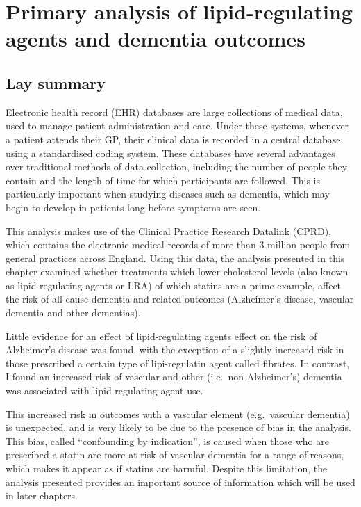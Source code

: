 \documentclass[a4paper, twoside]{templates/ociamthesis}
\begin{document}
\minitoc 



\hypertarget{cprd-analysis-heading}{%
\chapter{Primary analysis of lipid-regulating agents and dementia outcomes}\label{cprd-analysis-heading}}

\minitoc 

\hypertarget{lay-summary-3}{%
\section{Lay summary}\label{lay-summary-3}}

Electronic health record (EHR) databases are large collections of medical data, used to manage patient administration and care. Under these systems, whenever a patient attends their GP, their clinical data is recorded in a central database using a standardised coding system. These databases have several advantages over traditional methods of data collection, including the number of people they contain and the length of time for which participants are followed. This is particularly important when studying diseases such as dementia, which may begin to develop in patients long before symptoms are seen.

This analysis makes use of the Clinical Practice Research Datalink (CPRD), which contains the electronic medical records of more than 3 million people from general practices across England. Using this data, the analysis presented in this chapter examined whether treatments which lower cholesterol levels (also known as lipid-regulating agents or LRA) of which statins are a prime example, affect the risk of all-cause dementia and related outcomes (Alzheimer's disease, vascular dementia and other dementias).

Little evidence for an effect of lipid-regulating agents effect on the risk of Alzheimer's disease was found, with the exception of a slightly increased risk in those prescribed a certain type of lipi-regulatin agent called fibrates. In contrast, I found an increased risk of vascular and other (i.e.~non-Alzheimer's) dementia was associated with lipid-regulating agent use.

This increased risk in outcomes with a vascular element (e.g.~vascular dementia) is unexpected, and is very likely to be due to the presence of bias in the analysis. This bias, called ``confounding by indication'', is caused when those who are prescribed a statin are more at risk of vascular dementia for a range of reasons, which makes it appear as if statins are harmful. Despite this limitation, the analysis presented provides an important source of information which will be used in later chapters.
\end{document}
